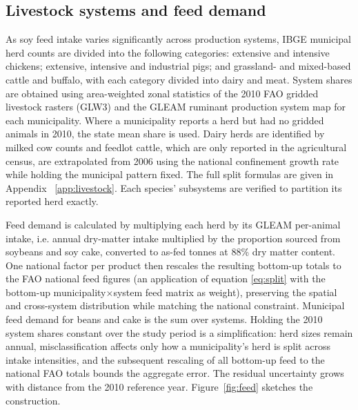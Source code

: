 \documentclass[pdflatex,sn-nature]{sn-jnl}%
\begin{document}
\subsection{Livestock systems and feed demand}\label{subsec:feed}
As soy feed intake varies significantly across production systems, IBGE municipal herd counts are divided into the following categories: extensive and intensive chickens; extensive, intensive and industrial pigs; and grassland- and mixed-based cattle and buffalo, with each category divided into dairy and meat. System shares are obtained using area-weighted zonal statistics of the 2010 FAO gridded livestock rasters (GLW3) and the GLEAM ruminant production system map for each municipality. Where a municipality reports a herd but had no gridded animals in 2010, the state mean share is used. Dairy herds are identified by milked cow counts and feedlot cattle, which are only reported in the agricultural census, are extrapolated from 2006 using the national confinement growth rate while holding the municipal pattern fixed. The full split formulas are given in Appendix ~\ref{app:livestock}. Each species' subsystems are verified to partition its reported herd exactly.

Feed demand is calculated by multiplying each herd by its GLEAM per-animal intake, i.e. annual dry-matter intake multiplied by the proportion sourced from soybeans and soy cake, converted to as-fed tonnes at 88\% dry matter content. One national factor per product then rescales the resulting bottom-up totals to the FAO national feed figures (an application of equation \eqref{eq:split} with the bottom-up municipality$\times$system feed matrix as weight), preserving the spatial and cross-system distribution while matching the national constraint. Municipal feed demand for beans and cake is the sum over systems. Holding the 2010 system shares constant over the study period is a simplification: herd sizes remain annual, misclassification affects only how a municipality's herd is split across intake intensities, and the subsequent rescaling of all bottom-up feed to the national FAO totals bounds the aggregate error. The residual uncertainty grows with distance from the 2010 reference year. Figure~\ref{fig:feed} sketches the construction.
\end{document}
